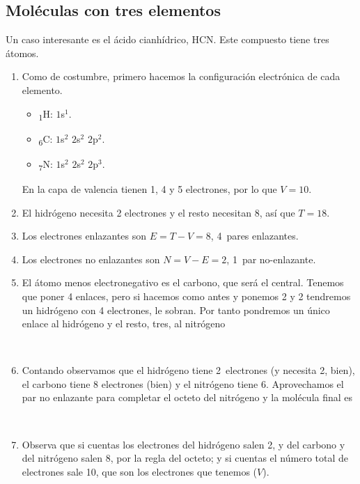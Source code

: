 \documentclass[twoside,a4paper,justified,12pt]{tufte-handout}
\renewcommand{\sb}[1]{\textsubscript{#1}}
\begin{document}
\subsection{Moléculas con tres elementos}

Un caso interesante es el ácido cianhídrico, HCN. Este compuesto tiene tres átomos.

\begin{enumerate}[1)]
    \item Como de costumbre, primero hacemos la configuración electrónica de cada elemento.
    \begin{itemize}
        \item \sb{1}H: $1$s$^1$.
        \item \sb{6}C: $1$s$^2$ $2$s$^2$ $2$p$^2$.
        \item \sb{7}N: $1$s$^2$ $2$s$^2$ $2$p$^3$.
    \end{itemize}
    
    En la capa de valencia tienen 1, 4 y 5 electrones, por lo que $V=10$.
    
    \item El hidrógeno necesita 2 electrones y el resto necesitan 8, así que $T=18$.
    
    \item Los electrones enlazantes son $E=T-V=8$, 4~pares enlazantes.
    
    \item Los electrones no enlazantes son $N=V-E=2$, 1~par no-enlazante.
    
    \item El átomo menos electronegativo es el carbono, que será el central. Tenemos que poner 4 enlaces, pero si hacemos como antes y ponemos 2 y 2 tendremos un hidrógeno con 4 electrones, le sobran. Por tanto pondremos un único enlace al hidrógeno y el resto, tres, al nitrógeno
    
     {\centering{}\\}
     
    \item Contando observamos que el hidrógeno tiene 2~electrones (y necesita 2, bien), el carbono tiene 8 electrones (bien) y el nitrógeno tiene 6. Aprovechamos el par no enlazante para completar el octeto del nitrógeno y la molécula final es
    
      {\centering{}\\}
      
    \item Observa que si cuentas los electrones del hidrógeno salen 2, y del carbono y del nitrógeno salen 8, por la regla del octeto; y si cuentas el número total de electrones sale 10, que son los electrones que tenemos ($V$).
    
\end{enumerate}
\end{document}
